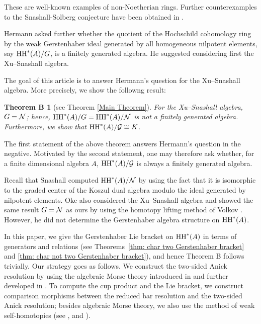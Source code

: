 \documentclass[10pt, reqno]{amsart}
\newtheorem*{thmB}{Theorem B}
\theoremstyle{definition}
\theoremstyle{remark}
\numberwithin{equation}{section}
\begin{document}
These are well-known examples of non-Noetherian rings. Further counterexamples to the Snashall-Solberg conjecture have been obtained in \cite{HF12, XZ12}.

  
Hermann \cite{Her16} asked further whether the quotient of the Hochschild cohomology ring by the weak Gerstenhaber ideal generated by all homogeneous nilpotent elements, say $\mathrm{HH}^*(A)/G$, is a finitely generated algebra. He suggested considering first the  Xu--Snashall algebra. 


The goal of this article is to answer Hermann's question   for the Xu--Snashall algebra. More precisely, we show the followng result:

\begin{thmB}[{see Theorem \ref{Main Theorem}}]\label{ThmB}
    For the Xu--Snashall algebra, $G=\mathcal{N}$; hence, $\mathrm{HH}^*(A)/G=\mathrm{HH}^*(A)/\mathcal{N}$ is not a finitely generated algebra.   Furthermore, we show that  $\mathrm{HH}^*(A)/\mathcal{G}\cong K$. 
\end{thmB}
The first statement of the above theorem  answers Hermann's question in the negative. Motivated by the second statement,  
one may therefore ask whether, for a finite dimensional algebra $A$,  $\mathrm{HH}^*(A)/\mathcal{G}$  is always a finitely generated algebra. 

Recall that Snashall \cite{Sna09} computed $\mathrm{HH}^*(A)/\mathcal{N}$ by using the fact that it is isomorphic to the graded center of the Koszul dual algebra modulo the ideal generated by nilpotent elements.  Oke \cite{Oke22} also considered the Xu--Snashall algebra and showed the same  result $G=\mathcal{N}$ as ours by using the homotopy lifting method of Volkov \cite{Vol19}. However, he did not determine the Gerstenhaber algebra structure on $\mathrm{HH}^*(A)$. 

 In this paper, we give the  Gerstenhaber Lie bracket on $\mathrm{HH}^*(A)$ in terms of generators and relations (see Theorems~\ref{thm:  char two Gerstenhaber bracket} and \ref{thm:  char not two Gerstenhaber bracket}), and hence  Theorem B follows trivially. 
 Our strategy goes as follows. 
 We construct the two-sided Anick  resolution by using the algebraic Morse theory introduced in \cite{Koz05, Sko06, JW09} and further developed in \cite{Sko18, CLZ24}. To compute the cup product and the  Lie bracket, we construct comparison morphisms between the reduced bar resolution and the two-sided Anick    resolution; besides algebraic Morse theory, we also use the method of weak self-homotopies (see \cite[Chapter IX Theorem 6.2]{ML67}, \cite{BZZ09} and \cite[Section 2]{IIVZ15}).
\end{document}
